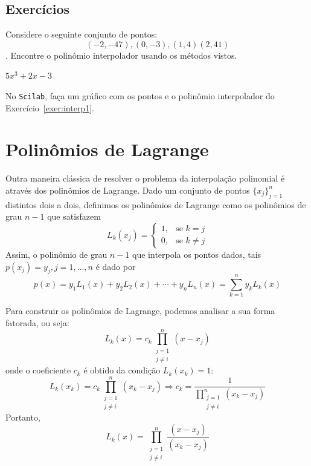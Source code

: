 \subsection*{Exercícios}


\begin{Exercise}\label{exer:interp1}
Considere o seguinte conjunto de pontos: $$(-2,-47),(0,-3),(1,4)(2,41)$$. Encontre o polinômio interpolador usando os métodos vistos. 
\end{Exercise}
\begin{Answer}
  \begin{tiny}
$5x^3+2x-3$    
  \end{tiny}
\end{Answer}

\ifisscilab
\begin{Exercise}
  No \verb+Scilab+, faça um gráfico com os pontos e o polinômio interpolador do Exercício~\ref{exer:interp1}.
\end{Exercise}
\fi

\section{Polinômios de Lagrange}
Outra maneira clássica de resolver o problema da interpolação polinomial é através dos polinômios de Lagrange. Dado um conjunto de pontos $\{x_j\}_{j=1}^n$ distintos dois a dois, definimos os polinômios de Lagrange como os polinômios de grau $n-1$ que satisfazem
$$
L_k(x_j)=\left\{\begin{array}{rl}
1,& \text{se }k=j\\
0,& \text{se }k\neq j
\end{array}
\right.
$$
Assim, o polinômio de grau $n-1$ que interpola os pontos dados, tais $p(x_j)=y_j, j=1,\ldots,n$ é dado por
$$p(x)=y_1L_1(x)+y_2L_2(x)+\cdots +y_nL_n(x)=\sum_{k=1}^n y_k L_k(x)$$

Para construir os polinômios de Lagrange, podemos analisar a sua forma fatorada, ou seja:
$$L_k(x)=c_k\prod_{\substack{j=1\\j\ne i}}^{n} (x-x_j)$$
onde o coeficiente $c_k$ é obtido da condição $L_k(x_k)=1$:
$$L_k(x_k)=c_k\prod_{\substack{j=1\\j\ne i}}^{n} (x_k-x_j) \Longrightarrow  c_k=\frac{1}{\displaystyle \prod_{\substack{j=1\\j\ne i}}^{n} (x_k-x_j)}$$
Portanto,
$$L_k(x)=\prod_{\substack{j=1\\j\ne i}}^{n} \frac{(x-x_j)}{(x_k-x_j)}$$

